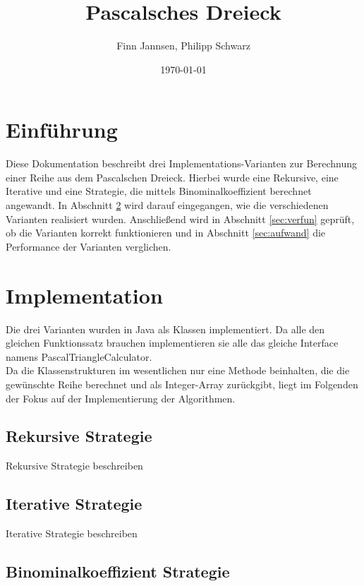 \documentclass[11pt]{scrartcl}
\title{Pascalsches Dreieck}
\author{Finn Jannsen, Philipp Schwarz}
\date{\today{}}
\begin{document}
\maketitle

\tableofcontents

\section{Einführung}
	\label{sec:einfuehrung}
	
	Diese Dokumentation beschreibt drei Implementations-Varianten zur Berechnung einer Reihe aus dem Pascalschen Dreieck.
	Hierbei wurde eine Rekursive, eine Iterative und eine Strategie, die mittels Binominalkoeffizient berechnet angewandt.
	In Abschnitt \ref{sec:implementation} wird darauf eingegangen, wie die verschiedenen Varianten realisiert wurden.
	Anschließend wird in Abschnitt \ref{sec:verfun} geprüft, ob die Varianten korrekt funktionieren und in Abschnitt \ref{sec:aufwand} die Performance der Varianten verglichen.

\section{Implementation}
	\label{sec:implementation}
	
	Die drei Varianten wurden in Java als Klassen implementiert. Da alle den gleichen Funktionssatz brauchen implementieren sie alle das gleiche Interface namens PascalTriangleCalculator.\\
	Da die Klassenstrukturen im wesentlichen nur eine Methode beinhalten, die die gewünschte Reihe berechnet und als Integer-Array zurückgibt, 
	liegt im Folgenden der Fokus auf der Implementierung der Algorithmen.


	\subsection{Rekursive Strategie}
		\label{sec:recStrat}
		
		Rekursive Strategie beschreiben
	
	\subsection{Iterative Strategie}
		\label{sec:iterStrat}
		
		Iterative Strategie beschreiben
	
	\subsection{Binominalkoeffizient Strategie}
		\label{sec:binoStrat}
		
\end{document}
